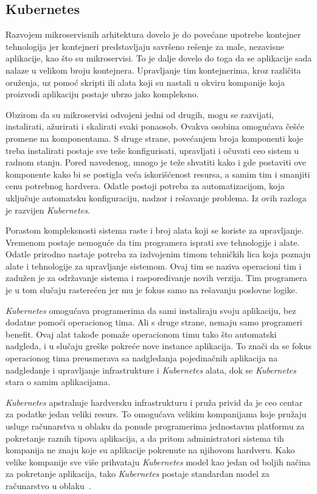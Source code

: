 \subsection{Kubernetes}\label{sec:kubernetes}

Razvojem mikroservisnih arhitektura dovelo je do povećane upotrebe kontejner tehnologija jer 
kontejneri predstavljaju savršeno rešenje za male, nezavisne aplikacije, kao što su mikroservisi. 
To je dalje dovelo do toga da se aplikacije sada nalaze u velikom broju kontejnera. Upravljanje 
tim kontejnerima, kroz različita oruženja, uz pomoć skripti ili alata koji su nastali u okviru 
kompanije koja proizvodi aplikaciju postaje ubrzo jako kompleksno. 

Obzirom da su mikroservisi odvojeni jedni od drugih, mogu se razvijati, instalirati, ažurirati i skalirati svaki ponaosob.
Ovakva osobina omogućava češće promene na komponentama. S druge strane, povećanjem broja komponenti koje treba 
instalirati postaje sve teže konfigurisati, upravljati i očuvati ceo sistem u radnom stanju. Pored navedenog, mnogo 
je teže shvatiti kako i gde postaviti ove komponente kako bi se postigla veća iskorišćenost resursa, a samim tim i 
smanjiti cenu potrebnog hardvera. Odatle postoji potreba za automatizacijom, koja uključuje automatsku konfiguraciju,
nadzor  i rešavanje problema. Iz ovih razloga je razvijen \textit{Kubernetes}.

Porastom kompleksnosti sistema raste i broj alata koji se koriste za upravljanje. Vremenom postaje 
nemoguće da tim programera isprati sve tehnologije i alate. Odatle prirodno nastaje potreba za 
izdvojenim timom tehničkih lica koja poznaju alate i tehnologije za upravljanje sistemom. Ovaj tim 
se naziva operacioni tim i zadužen je za održavanje sistema i raspoređivanje novih verzija. Tim 
programera je u tom slučaju rasterećen jer mu je fokus samo na rešavanju poslovne logike.

\textit{Kubernetes} omogućava programerima da sami instaliraju svoju aplikaciju, bez dodatne pomoći operacionog tima. 
Ali s druge strane, nemaju samo programeri benefit. Ovaj alat takođe pomaže operacionom timu tako što automatski nadgleda, 
i u slučaju greške pokreće nove instance aplikacija. To znači da se fokus operacionog tima preusmerava sa nadgledanja
pojedinačnih aplikacija na nadgledanje i upravljanje infrastrukture i \textit{Kubernetes} alata, dok se \textit{Kubernetes} stara o samim
aplikacijama.

\textit{Kubernetes} apstrahuje hardversku infrastrukturu i pruža privid da je ceo centar za podatke jedan veliki resurs. To omogućava
velikim kompanijama koje pružaju usluge računarstva u oblaku da ponude programerima jednostavnu platformu za pokretanje
raznih tipova aplikacija, a da pritom administratori sistema tih kompanija ne znaju koje su aplikacije pokrenute na njihovom
hardveru. Kako velike kompanije sve više prihvataju \textit{Kubernetes} model kao jedan od boljih načina za pokretanje aplikacija,
tako \textit{Kubernetes} postaje standardan model za računarstvo u oblaku~\cite{KIA}.

